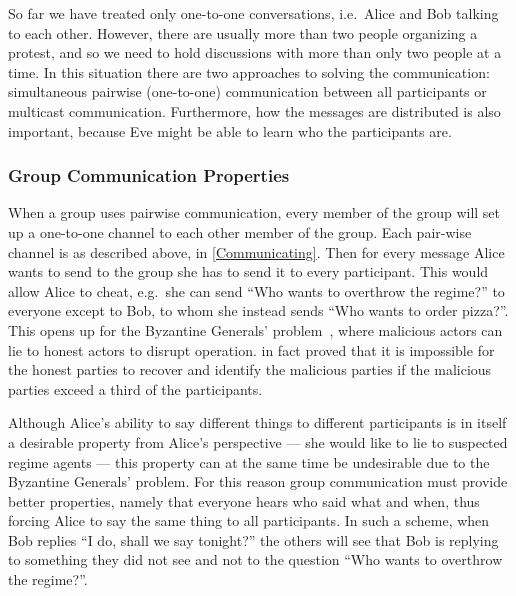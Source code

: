 So far we have treated only one-to-one conversations, i.e.\ Alice and Bob 
talking to each other.
However, there are usually more than two people organizing a protest, and so we 
need to hold discussions with more than only two people at a time.
In this situation there are two approaches to solving the communication:
simultaneous pairwise (one-to-one) communication between all participants or 
multicast communication.
Furthermore, how the messages are distributed is also important, because Eve 
might be able to learn who the participants are.

\subsubsection{Group Communication Properties}
\label{GroupProperties}

When a group uses pairwise communication, every member of the group will set up 
a one-to-one channel to each other member of the group.
Each pair-wise channel is as described above, in \cref{Communicating}.
Then for every message Alice wants to send to the group she has to send it to 
every participant.
This would allow Alice to cheat, e.g.\ she can send \enquote{Who wants to 
  overthrow the regime?} to everyone except to Bob, to whom she instead sends 
\enquote{Who wants to order pizza?}.
This opens up for the Byzantine Generals' problem~\cite{ByzantineGenerals}, 
where malicious actors can lie to honest actors to disrupt operation.
\citet{ByzantineGenerals} in fact proved that it is impossible for the honest 
parties to recover and identify the malicious parties if the malicious parties 
exceed a third of the participants.
  
Although Alice's ability to say different things to different participants is 
in itself a desirable property from Alice's perspective --- she would like to 
lie to suspected regime agents --- this property can at the same time be 
undesirable due to the Byzantine Generals' problem.
For this reason group communication must provide better properties, namely that 
everyone hears who said what and when, thus forcing Alice to say the same thing 
to all participants.
In such a scheme, when Bob replies \enquote{I do, shall we say tonight?} the 
others will see that Bob is replying to something they did not see and not to 
the question \enquote{Who wants to overthrow the regime?}.

